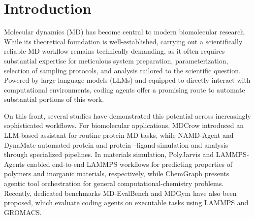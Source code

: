 \documentclass[twoside,twocolumn,9pt]{article}
\begin{document}

\rmfamily %



\section{Introduction}

Molecular dynamics (MD) has become central to modern biomolecular research.\cite{hollingsworth2018molecular,huggins2019biomolecular} While its theoretical foundation is well-established, carrying out a scientifically reliable MD workflow remains technically demanding, as it often requires substantial expertise for meticulous system preparation, parameterization, selection of sampling protocols, and analysis tailored to the scientific question. Powered by large language models (LLMs)\cite{zhao2023survey} and equipped to directly interact with computational environments, coding agents\cite{liu2024large} offer a promising route to automate substantial portions of this work. 

On this front, several studies have demonstrated this potential across increasingly sophisticated workflows. For biomolecular applications, MDCrow\cite{campbell2026mdcrow} introduced an LLM-based assistant for routine protein MD tasks, while NAMD-Agent\cite{chandrasekhar2025namdagent} and DynaMate \cite{guilbert2025dynamate} automated protein and protein–-ligand simulation and analysis through specialized pipelines. In materials simulation, PolyJarvis\cite{zhao2026polyjarvis} and LAMMPS-Agents\cite{vriza2026multiagentic} enabled end-to-end LAMMPS\cite{thompson2022lammps} workflows for predicting properties of polymers and inorganic materials, respectively, while ChemGraph\cite{pham2026chemgraph} presents agentic tool orchestration for general computational-chemistry problems. Recently, dedicated benchmarks MD-EvalBench\cite{shi2026mdagent2} and MDGym\cite{kumar2026mdgym} have also been proposed, which evaluate coding agents on executable tasks using LAMMPS\cite{thompson2022lammps} and GROMACS.\cite{abraham2015gromacs} 
\end{document}
